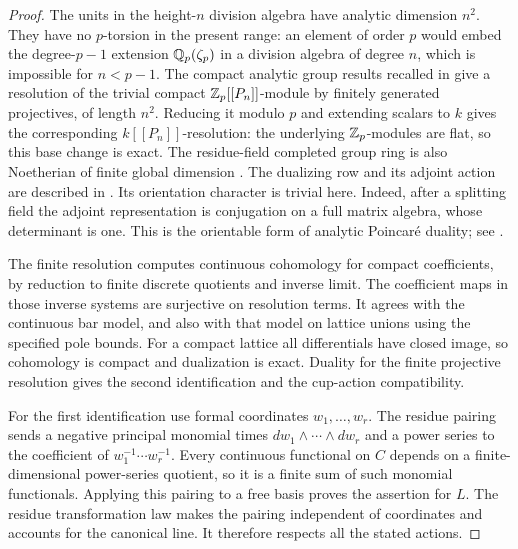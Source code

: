 \begin{proof}
The units in the height-$n$ division algebra have analytic dimension
$n^2$.  They have no $p$-torsion in the present range: an element of
order $p$ would embed the degree-$p-1$ extension $\mathbb Q_p(\zeta_p)$ in a
division algebra of degree $n$, which is impossible for $n<p-1$.
The compact analytic group results recalled in
\cite[Sections~1.1--1.2]{Venjakob} give a resolution of the trivial
compact $\mathbb Z_p[[P_n]]$-module by finitely generated projectives, of
length $n^2$.  Reducing it modulo $p$ and extending scalars to $k$
gives the corresponding $k[[P_n]]$-resolution: the underlying
$\mathbb Z_p$-modules are flat, so this base change is exact.  The residue-field
completed group ring is also Noetherian of finite global dimension
\cite[Proposition~3.3]{ArdakovWadsley}.  The dualizing row and its adjoint action are described in
\cite[Propositions~4.16 and~4.40, and Remark~4.23]{BGHS}.
Its orientation character is trivial here.  Indeed, after a splitting field the adjoint
representation is conjugation on a full matrix algebra, whose
determinant is one.  This is the orientable form of analytic
Poincar\'e duality; see \cite{Lazard,SerreGalois}.

The finite resolution computes continuous cohomology for compact
coefficients, by reduction to finite discrete quotients and inverse
limit.  The coefficient maps in those inverse systems are surjective
on resolution terms.  It agrees with the continuous bar model, and
also with that model on lattice unions using the specified pole
bounds.  For a compact lattice all differentials have closed image,
so cohomology is compact and dualization is exact.  Duality for the
finite projective resolution gives the second identification and the
cup-action compatibility.

For the first identification use formal coordinates $w_1,\ldots,w_r$.
The residue pairing sends a negative principal monomial times
$dw_1\wedge\cdots\wedge dw_r$ and a power series to the coefficient
of $w_1^{-1}\cdots w_r^{-1}$.  Every continuous functional on $C$
depends on a finite-dimensional power-series quotient, so it is a
finite sum of such monomial functionals.  Applying this pairing to a
free basis proves the assertion for $L$.  The residue transformation
law makes the pairing independent of coordinates and accounts for
the canonical line.  It therefore respects all the stated actions.
\end{proof}
